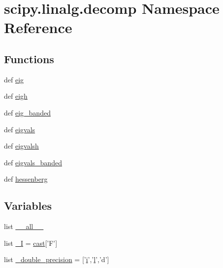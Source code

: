 \hypertarget{namespacescipy_1_1linalg_1_1decomp}{}\section{scipy.\+linalg.\+decomp Namespace Reference}
\label{namespacescipy_1_1linalg_1_1decomp}
\subsection*{Functions}
\begin{DoxyCompactItemize}
\item 
def \hyperlink{namespacescipy_1_1linalg_1_1decomp_a536fc1eb089fd71a672e21d4b0c82e6b}{eig}
\item 
def \hyperlink{namespacescipy_1_1linalg_1_1decomp_af1e11b6ecf545c4c3b2b7c832bb02393}{eigh}
\item 
def \hyperlink{namespacescipy_1_1linalg_1_1decomp_a3a09100409f2de4d5f8cc2ecfc3cc507}{eig\+\_\+banded}
\item 
def \hyperlink{namespacescipy_1_1linalg_1_1decomp_a0e88e13f255d5a6600817acbaf692d39}{eigvals}
\item 
def \hyperlink{namespacescipy_1_1linalg_1_1decomp_a4587c8d8bb28100820eaef656b3e8ba8}{eigvalsh}
\item 
def \hyperlink{namespacescipy_1_1linalg_1_1decomp_acca8d54e86bbb0a0c2d7bc96caca22dc}{eigvals\+\_\+banded}
\item 
def \hyperlink{namespacescipy_1_1linalg_1_1decomp_aa0d30ab6fedf9ed8716bb691ac6b749b}{hessenberg}
\end{DoxyCompactItemize}
\subsection*{Variables}
\begin{DoxyCompactItemize}
\item 
list \hyperlink{namespacescipy_1_1linalg_1_1decomp_aed4bc8f65864af8dae58416aef1dec7e}{\+\_\+\+\_\+all\+\_\+\+\_\+}
\item 
list \hyperlink{namespacescipy_1_1linalg_1_1decomp_a876dcd3eb7c70eeae0fa8ca049073d25}{\+\_\+\+I} = \hyperlink{misc_8cc_a1028bfebf701b453dfc1d69af9d5c723}{cast}\mbox{[}'F'\mbox{]}
\item 
list \hyperlink{namespacescipy_1_1linalg_1_1decomp_a7db1b5614c050a812a097fb7abf39064}{\+\_\+double\+\_\+precision} = \mbox{[}'\hyperlink{indexexpr_8h_aabd77643995707c185e95c8cb2782c81}{i}','\hyperlink{indexexpr_8h_a88aacdaa46b76729743ee33ef8b95a58}{l}','d'\mbox{]}
\end{DoxyCompactItemize}


